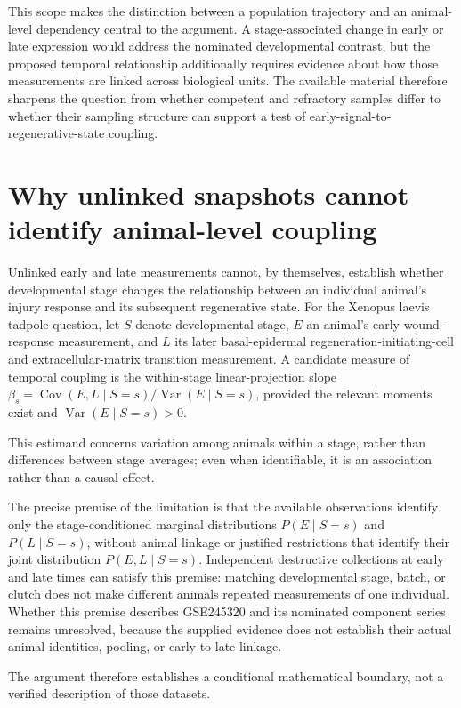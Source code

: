 \documentclass[11pt]{article}
\begin{document}
This scope makes the distinction between a population trajectory and an animal-level dependency central to the argument. A stage-associated change in early or late expression would address the nominated developmental contrast, but the proposed temporal relationship additionally requires evidence about how those measurements are linked across biological units. The available material therefore sharpens the question from whether competent and refractory samples differ to whether their sampling structure can support a test of early-signal-to-regenerative-state coupling.

\section{Why unlinked snapshots cannot identify animal-level coupling}
Unlinked early and late measurements cannot, by themselves, establish whether developmental stage changes the relationship between an individual animal\textquoteright{}s injury response and its subsequent regenerative state. For the Xenopus laevis tadpole question, let $S$ denote developmental stage, $E$ an animal\textquoteright{}s early wound-response measurement, and $L$ its later basal-epidermal regeneration-initiating-cell and extracellular-matrix transition measurement. A candidate measure of temporal coupling is the within-stage linear-projection slope $\beta_s=\operatorname{Cov}(E,L\mid S=s)/\operatorname{Var}(E\mid S=s)$, provided the relevant moments exist and $\operatorname{Var}(E\mid S=s)>0$.

This estimand concerns variation among animals within a stage, rather than differences between stage averages; even when identifiable, it is an association rather than a causal effect.

The precise premise of the limitation is that the available observations identify only the stage-conditioned marginal distributions $P(E\mid S=s)$ and $P(L\mid S=s)$, without animal linkage or justified restrictions that identify their joint distribution $P(E,L\mid S=s)$. Independent destructive collections at early and late times can satisfy this premise: matching developmental stage, batch, or clutch does not make different animals repeated measurements of one individual. Whether this premise describes GSE245320 and its nominated component series remains unresolved, because the supplied evidence does not establish their actual animal identities, pooling, or early-to-late linkage.

The argument therefore establishes a conditional mathematical boundary, not a verified description of those datasets.
\end{document}
